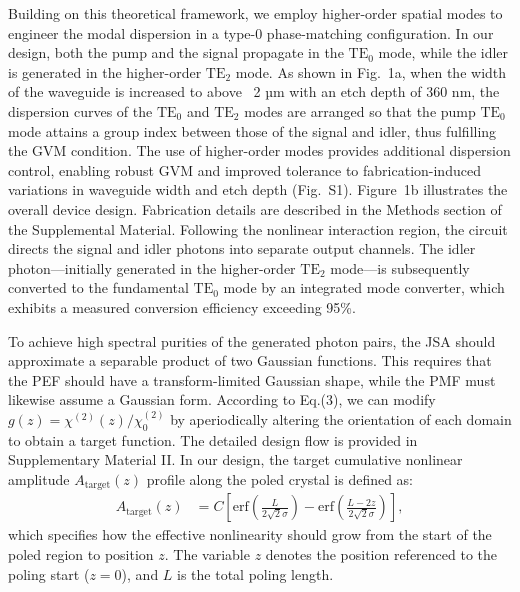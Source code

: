 \documentclass[aps, amsmath, amssymb,reprint,superscriptaddress]{revtex4-2}
\begin{document}
Building on this theoretical framework, we employ higher-order spatial modes to engineer the modal dispersion in a type-0 phase-matching configuration. In our design, both the pump and the signal propagate in the $\mathrm{TE_0}$ mode, while the idler is generated in the higher-order $\mathrm{TE_2}$ mode. As shown in Fig.~1a, when the width of the waveguide is increased to above ~2 µm with an etch depth of 360 nm, the dispersion curves of the $\mathrm{TE_0}$ and $\mathrm{TE_2}$ modes are arranged so that the pump $\mathrm{TE_0}$ mode attains a group index between those of the signal and idler, thus fulfilling the GVM condition. The use of higher-order modes provides additional dispersion control, enabling robust GVM and improved tolerance to fabrication-induced variations in waveguide width and etch depth (Fig.~S1). Figure~1b illustrates the overall device design. Fabrication details are described in the Methods section of the Supplemental Material. Following the nonlinear interaction region, the circuit directs the signal and idler photons into separate output channels. The idler photon—initially generated in the higher-order $\mathrm{TE_2}$ mode—is subsequently converted to the fundamental $\mathrm{TE_0}$ mode by an integrated mode converter, which exhibits a measured conversion efficiency exceeding 95\%.

To achieve high spectral purities of the generated photon pairs, the JSA should approximate a separable product of two Gaussian functions. This requires that the PEF should have a transform-limited Gaussian shape, while the PMF must likewise assume a Gaussian form. According to Eq.(3), we can modify $g(z)=\chi^{(2)}(z)/\chi_0^{(2)}$ by aperiodically altering the orientation of each domain to obtain a target function\cite{2017Gpdesign,2018independent}. The detailed design flow is provided in Supplementary Material II. In our design, the target cumulative nonlinear amplitude $A_{\mathrm{target}}(z)$ profile along the poled crystal is defined as:
\begin{align}
A_{\mathrm{target}}(z)
&= C\!\left[
\mathrm{erf}\!\left(\frac{L}{2\sqrt{2}\sigma}\right)
- \mathrm{erf}\!\left(\frac{L - 2z}{2\sqrt{2}\sigma}\right)
\right],
\end{align} which specifies how the effective nonlinearity should grow from the start of the poled region to position $z$. The variable $z$ denotes the position referenced to the poling start ($z=0$), and $L$ is the total poling length.
\end{document}
